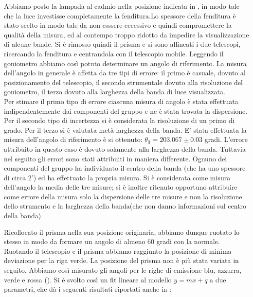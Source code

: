 Abbiamo posto la lampada al cadmio nella posizione indicata in , in modo tale che la luce investisse completamente la fenditura.Lo spessore della fenditura è stato scelto in modo tale da non esssere eccessivo e quindi compromettere la qualità della misura, ed al contempo troppo ridotto da impedire la visualizzazione di alcune bande. \newline
 Si è rimosso quindi il prisma e si sono allineati i due telescopi, ricercando la fenditura e centrandola con il telescopio mobile. Leggendo il goniometro abbiamo così potuto determinare un angolo di riferimento. \newline
  La misura dell'angolo in generale è affetta da tre tipi di errore: il primo è casuale, dovuto al posizionamento del telescopio, il secondo strumentale dovuto alla  risoluzione del goniometro, il terzo dovuto alla larghezza della banda di luce visualizzata. \\
Per stimare il primo tipo di errore ciascuna misura di angolo è stata effettuata indipendentemente dai componenti del gruppo e ne è stata trovata la dispersione. Per il secondo tipo di incertezza si è considerata la risoluzione di un primo di grado. Per il terzo si è valutata metà larghezza della banda. \newline
 E' stata effettuata la misura dell'angolo di riferimento è si ottenuto: $\theta_{0}=203.067 \pm 0.03$ gradi. L'errore attribuito in questo caso è dovuto solamente alla larghezza della banda. Tuttavia nel seguito gli errori sono stati attribuiti in maniera differente. Ognuno dei componenti del gruppo ha individuato il centro della banda (che ha uno spessore di circa 2') ed ha effettuato la propria misura. Si è  considerata come misura dell'angolo la media delle tre misure; si è inoltre ritenuto opportuno attribuire come errore della misura solo la dispersione delle tre misure e non la risoluzione dello strumento e la larghezza della banda(che non danno informazioni sul centro della banda)  \newline
 
Ricollocato il prisma nella sua posizione originaria, abbiamo dunque ruotato lo stesso in modo da formare un angolo di almeno 60 gradi con la normale. Ruotando il telescopio e il prisma abbiamo raggiunto la posizione di minima deviazione per la riga verde. La posizione del prisma non è più stata variata in seguito. Abbiamo così misurato gli angoli per le righe di emissione blu, azzurra, verde e rossa (). Si è svolto così un fit lineare al modello $y=mx+q$ a due parametri, che dà i seguenti risultati riportati anche in :

